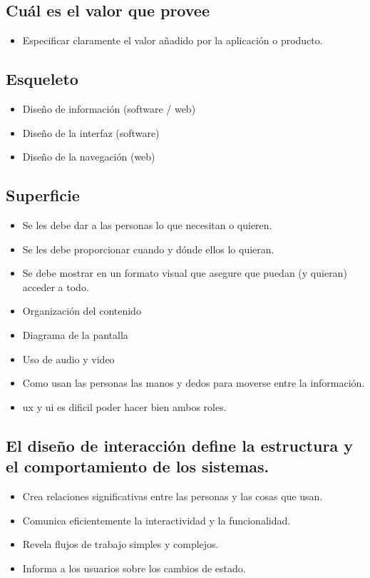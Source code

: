 \documentclass{article}
\begin{document}
\subsection{Cuál es el valor que provee}
\begin{itemize}
    \item Especificar claramente el valor añadido por la aplicación o producto.
\end{itemize}

\subsection{Esqueleto}
\begin{itemize}
    \item Diseño de información (software / web)
    \item Diseño de la interfaz (software)
    \item Diseño de la navegación (web)
\end{itemize}
\subsection{Superficie}
\begin{itemize}
    \item Se les debe dar a las personas lo que necesitan o quieren.
    \item Se les debe proporcionar cuando y dónde ellos lo quieran.
    \item Se debe mostrar en un formato visual que asegure que puedan (y quieran) acceder a todo.
    \item Organización del contenido
    \item Diagrama de la pantalla
    \item Uso de audio y video
    \item Como usan las personas las manos y dedos para moverse entre la información.
\end{itemize}

\begin{itemize}
    \item ux y ui es dificil poder hacer bien ambos roles.
\end{itemize}

\subsection{El diseño de interacción define la estructura y el comportamiento de los sistemas.}
\begin{itemize}
    \item Crea relaciones significativas entre las personas y las cosas que usan.
    \item Comunica eficientemente la interactividad y la funcionalidad.
    \item Revela flujos de trabajo simples y complejos.
    \item Informa a los usuarios sobre los cambios de estado.
\end{itemize}
\end{document}
